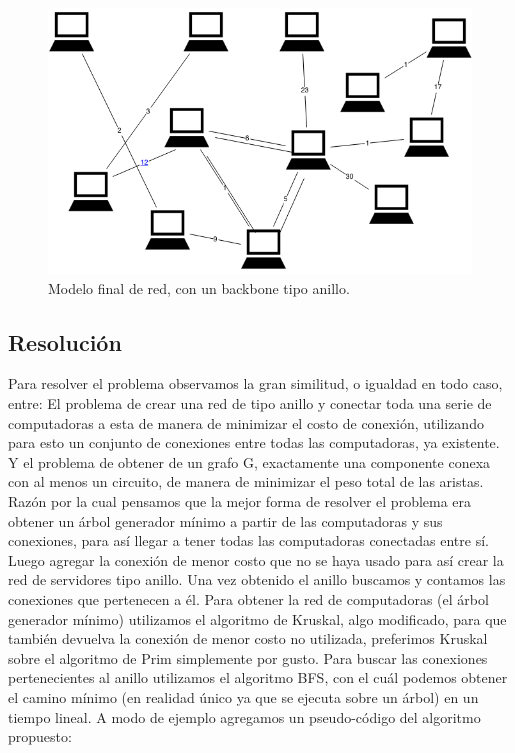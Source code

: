 \begin{figure}[H]
\begin{center}
\includegraphics[scale=.45]{./imagenes/ej3_ejemplo2.png}
\caption{Modelo final de red, con un backbone tipo anillo.}
\end{center}
\end{figure}

\newpage


\subsection{Resoluci\'on}

Para resolver el problema observamos la gran similitud, o igualdad en todo caso, entre:
El problema de crear una red de tipo anillo y conectar toda una serie de computadoras a esta de manera de minimizar el costo de conexión, utilizando para esto un conjunto de conexiones entre todas las computadoras, ya existente.
Y el problema de obtener de un grafo G, exactamente una componente conexa con al menos un circuito, de manera de minimizar el peso total de las aristas. Razón por la cual pensamos que la mejor forma de resolver el problema era obtener un árbol generador mínimo a partir de las computadoras y sus conexiones, para así llegar a tener todas las computadoras conectadas entre sí. Luego agregar la conexión de menor costo que no se haya usado para así crear la red de servidores tipo anillo.
Una vez obtenido el anillo buscamos y contamos las conexiones que pertenecen a \'el.
Para obtener la red de computadoras (el \'arbol generador m\'inimo) utilizamos el algoritmo de Kruskal, algo modificado, para que tambi\'en devuelva la conexi\'on de menor costo no utilizada, preferimos Kruskal sobre el algoritmo de Prim simplemente por gusto. Para buscar las conexiones pertenecientes al anillo utilizamos el algoritmo BFS, con el cu\'al podemos obtener el camino m\'inimo (en realidad \'unico ya que se ejecuta sobre un \'arbol) en un tiempo lineal.
A modo de ejemplo agregamos un pseudo-código del algoritmo propuesto:

